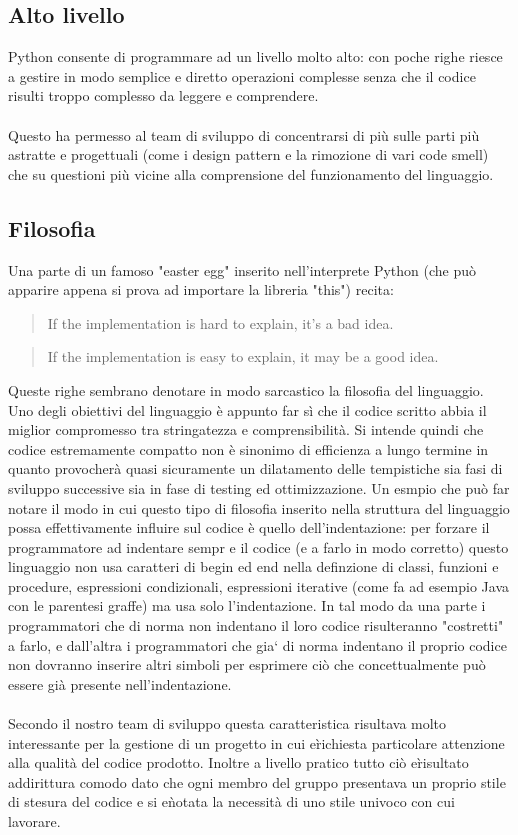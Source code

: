 \documentclass[12pt]{scrartcl}
\begin{document}
\subsection{Alto livello}
Python consente di programmare ad un livello molto alto: con poche righe riesce a gestire
in modo semplice e diretto operazioni complesse senza che il codice risulti troppo complesso da leggere e comprendere.
\\ \\
Questo ha permesso al team di sviluppo di concentrarsi di pi\`u sulle parti pi\`u astratte
e progettuali (come i design pattern e la rimozione di vari code smell) che
su questioni pi\`u vicine alla comprensione del funzionamento del linguaggio.
\subsection{Filosofia}
Una parte di un famoso "easter egg" inserito nell'interprete Python (che pu\`o apparire appena si
prova ad importare la libreria "this") recita:
\begin{quotation}
If the implementation is hard to explain, it's a bad idea.
\end{quotation}

\begin{quotation}
If the implementation is easy to explain, it may be a good idea.
\end{quotation}
Queste righe sembrano denotare in modo sarcastico la filosofia del linguaggio.
Uno degli obiettivi del linguaggio \`e appunto far s\`i che il codice scritto
abbia il miglior compromesso tra stringatezza e comprensibilit\`a. Si intende
quindi che codice estremamente compatto non \`e sinonimo di efficienza a lungo termine
in quanto provocher\`a quasi sicuramente un dilatamento delle tempistiche
sia fasi di sviluppo successive sia in fase di testing ed ottimizzazione.
Un esmpio che pu\`o far notare il modo in cui questo tipo di filosofia inserito
nella struttura del linguaggio possa effettivamente influire sul codice \`e 
quello dell'indentazione: per forzare il programmatore ad indentare sempr
e il codice (e a farlo in modo corretto) questo linguaggio non usa caratteri
di begin ed end nella definzione di classi, funzioni e procedure,
espressioni condizionali, espressioni iterative (come fa ad esempio Java con le
parentesi graffe) ma usa solo l'indentazione. In tal modo da una parte i programmatori
che di norma non indentano il loro codice risulteranno "costretti" a farlo,
e dall'altra i programmatori che gia` di norma indentano il proprio codice
non dovranno inserire altri simboli per esprimere ci\`o che concettualmente
pu\`o essere gi\`a presente nell'indentazione. \\ \\
Secondo il nostro team di sviluppo questa caratteristica risultava molto
interessante per la gestione di un progetto in cui e\` richiesta
particolare attenzione alla qualit\`a del codice prodotto. Inoltre a livello
pratico tutto ci\`o e\` risultato addirittura comodo dato che ogni membro
del gruppo presentava un proprio stile di stesura del codice e si e\` notata la
necessit\`a di uno stile univoco con cui lavorare.

\begin{thebibliography}{10}	


\end{thebibliography}
\end{document}
